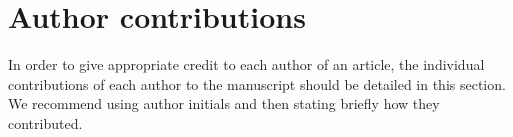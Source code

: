 \section*{Author contributions}
In order to give appropriate credit to each author of an article, the individual contributions of each author to the manuscript should be detailed in this section. We recommend using author initials and then stating briefly how they contributed.
